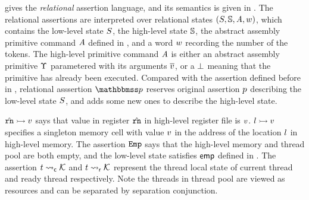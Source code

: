 \Fig{\ref{fig:Syntax of Relational Assertion}} gives 
the {\it relational} assertion language, and its semantics 
is given in \Fig{\ref{fig:Semantics of Relation Assertion}}. 
The relational assertions are interpreted over relational 
states $(S, \mathbb{S}, \textit{A}, w)$, which 
contains the low-level state $S$, 
the high-level state $\mathbb{S}$, 
the abstract assembly primitive command $\textit{A}$ 
defined in \Fig{\ref{fig:Semantics of Relation Assertion}}, 
and a word $w$ recording the number of the tokens. 
The high-level primitive command $\textit{A}$ is 
either an abstract assembly primitive $\Upsilon$ 
parametered with its arguments $\overline{v}$, or a 
$\perp$ meaning that the primitive has already been 
executed. Compared with the assertion defined before in 
\Fig{\ref{fig:Syntax of Assertions}}, relational 
asssertion $\relastP$ reserves original assertion 
$p$ describing the low-level state $S$, and 
adds some new ones to describe the high-level state. 

${\hat{\texttt{rn}}} \rightarrowtail {v}$ says that value in register 
$\hat{\texttt{rn}}$ in high-level register file is $v$. 
${l} \rightarrowtail {v}$ specifies a singleton memory 
cell with value $v$ in the address of the location 
$l$ in high-level memory. The assertion $\texttt{Emp}$ 
says that the high-level memory and thread pool are 
both empty, and the low-level state satisfies $\textsf{emp}$ 
defined in \Fig{\ref{fig:Semantics of Assertions}}. 
The assertion ${t} \leadsto_{\textsf{c}} {\mathcal{K}}$ 
and ${t} \leadsto_{\textsf{r}} {\mathcal{K}}$ represent 
the thread local state of current thread and ready 
thread respectively. Note the threads in thread pool 
are viewed as resources and can be separated by 
separation conjunction. 

